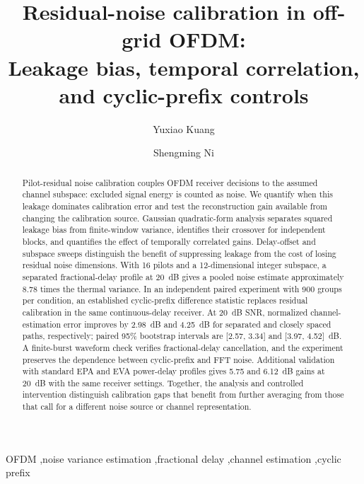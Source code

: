 \documentclass[preprint,11pt]{elsarticle}
\begin{document}
\begin{frontmatter}
\title{Residual-noise calibration in off-grid OFDM:\\Leakage bias, temporal correlation, and cyclic-prefix controls}
\author{Yuxiao Kuang}
\author{Shengming Ni}
\address{Nanjing University of Posts and Telecommunications, Xianlin Campus, 9 Wenyuan Road, Nanjing 210023, China}
\begin{abstract}
Pilot-residual noise calibration couples OFDM receiver decisions to the
assumed channel subspace: excluded signal energy is counted as noise.
We quantify when this leakage dominates calibration error and test the
reconstruction gain available from changing the calibration source.
Gaussian quadratic-form analysis separates squared leakage bias from
finite-window variance, identifies their crossover for independent blocks,
and quantifies the effect of temporally correlated gains. Delay-offset and subspace sweeps distinguish
the benefit of suppressing leakage from the cost of losing residual noise
dimensions. With 16 pilots and a 12-dimensional integer subspace, a separated
fractional-delay profile at 20~dB gives a pooled noise estimate approximately
8.78 times the thermal variance. In an independent paired experiment with
900 groups per condition, an established cyclic-prefix difference statistic
replaces residual calibration in the same continuous-delay receiver. At
20~dB SNR, normalized channel-estimation error improves by 2.98~dB and
4.25~dB for separated and closely spaced paths, respectively; paired 95\%
bootstrap intervals are [2.57, 3.34] and [3.97, 4.52]~dB. A finite-burst
waveform check verifies fractional-delay cancellation, and the experiment
preserves the dependence between cyclic-prefix and FFT noise. Additional
validation with standard EPA and EVA power-delay profiles gives 5.75 and
6.12~dB gains at 20~dB with the same receiver settings. Together,
the analysis and controlled intervention distinguish calibration gaps that
benefit from further averaging from those that call for a different noise
source or channel representation.
\end{abstract}
\begin{keyword}
OFDM \sep noise variance estimation \sep fractional delay \sep channel estimation \sep cyclic prefix
\end{keyword}
\end{frontmatter}



\CoreDiscussion
\end{document}
